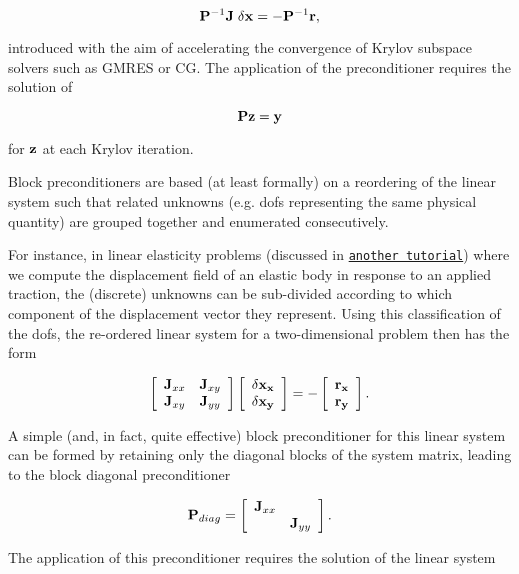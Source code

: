 \[ {\bf P}^{-1}{\bf J}\;{\bf \delta x}=-{\bf P}^{-1}{\bf r}, \]

introduced with the aim of accelerating the convergence of Krylov subspace solvers such as G\+M\+R\+ES or CG. The application of the preconditioner requires the solution of

\[ {\bf P}{\bf z}={\bf y} \]

for $\bf z$ at each Krylov iteration.

Block preconditioners are based (at least formally) on a reordering of the linear system such that related unknowns (e.\+g. dofs representing the same physical quantity) are grouped together and enumerated consecutively.

For instance, in linear elasticity problems (discussed in \href{../../../linear_elasticity/periodic_load/html/index.html}{\tt another tutorial}) where we compute the displacement field of an elastic body in response to an applied traction, the (discrete) unknowns can be sub-\/divided according to which component of the displacement vector they represent. Using this classification of the dofs, the re-\/ordered linear system for a two-\/dimensional problem then has the form

\[ \left[ \begin{array}{cc} {\bf J}_{xx}&{\bf J}_{xy}\\ {\bf J}_{xy}&{\bf J}_{yy} \end{array} \right] \left[ \begin{array}{c} \bf \delta x_x\\ \bf \delta x_y\\ \end{array} \right] = - \left[ \begin{array}{c} \bf r_x\\ \bf r_y\\ \end{array} \right]. \]

A simple (and, in fact, quite effective) block preconditioner for this linear system can be formed by retaining only the diagonal blocks of the system matrix, leading to the block diagonal preconditioner

\[ {\bf P}_{diag}= \left[ \begin{array}{cc} {\bf J}_{xx}& \\ &{\bf J}_{yy} \end{array} \right]. \]

The application of this preconditioner requires the solution of the linear system

